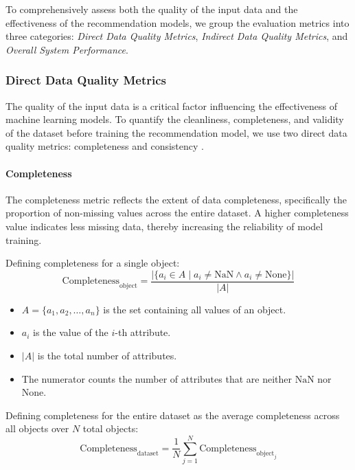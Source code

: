 \documentclass{ieeeaccess}
\begin{document}
To comprehensively assess both the quality of the input data and the effectiveness of the recommendation models, we group the evaluation metrics into three categories: \textit{Direct Data Quality Metrics}, \textit{Indirect Data Quality Metrics}, and \textit{Overall System Performance}.

\subsubsection{Direct Data Quality Metrics}
\label{subsubsec:direct DQ}
The quality of the input data is a critical factor influencing the effectiveness of machine learning models. To quantify the cleanliness, completeness, and validity of the dataset before training the recommendation model, we use two direct data quality metrics: completeness and consistency \cite{nguyen2025data_quality}.

\paragraph*{Completeness}

The completeness metric \cite{nguyen2025data_quality} reflects the extent of data completeness, specifically the proportion of non-missing values across the entire dataset. A higher completeness value indicates less missing data, thereby increasing the reliability of model training.

Defining completeness for a single object:
\begin{equation}
    \text{Completeness}_{\text{object}} = \frac{|\{a_i \in A \mid a_i \neq \text{NaN} \land a_i \neq \text{None}\}|}{|A|}
\end{equation}

\begin{itemize}
    \item \( A = \{a_1, a_2, \ldots, a_n\} \) is the set containing all values of an object.
    \item \( a_i \) is the value of the \( i \)-th attribute.
    \item \( |A| \) is the total number of attributes.
    \item The numerator counts the number of attributes that are neither \(\text{NaN}\) nor \(\text{None}\).
\end{itemize}

Defining completeness for the entire dataset as the average completeness across all objects over \( N \) total objects:
\begin{equation}
\text{Completeness}_{\text{dataset}} = \frac{1}{N} \sum_{j=1}^{N} \text{Completeness}_{\text{object}_j}
\end{equation}
\end{document}
